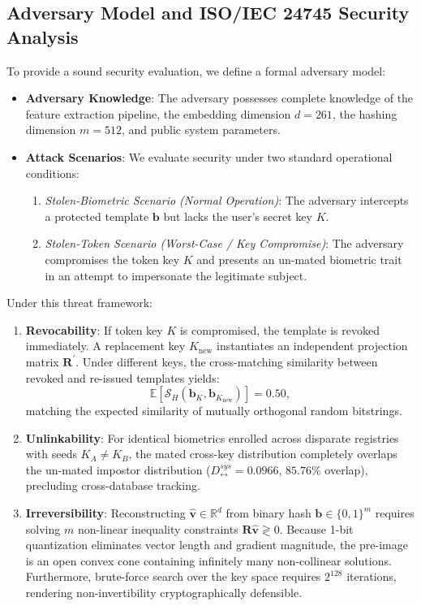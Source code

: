 \documentclass[lettersize,journal]{IEEEtran}
\begin{document}
\subsection{Adversary Model and ISO/IEC 24745 Security Analysis}
To provide a sound security evaluation, we define a formal adversary model:
\begin{itemize}
    \item \textbf{Adversary Knowledge}: The adversary possesses complete knowledge of the feature extraction pipeline, the embedding dimension $d=261$, the hashing dimension $m=512$, and public system parameters.
    \item \textbf{Attack Scenarios}: We evaluate security under two standard operational conditions:
    \begin{enumerate}
        \item \textit{Stolen-Biometric Scenario (Normal Operation)}: The adversary intercepts a protected template $\mathbf{b}$ but lacks the user's secret key $K$.
        \item \textit{Stolen-Token Scenario (Worst-Case / Key Compromise)}: The adversary compromises the token key $K$ and presents an un-mated biometric trait in an attempt to impersonate the legitimate subject.
    \end{enumerate}
\end{itemize}

Under this threat framework:
\begin{enumerate}
    \item \textbf{Revocability}: If token key $K$ is compromised, the template is revoked immediately. A replacement key $K_{\text{new}}$ instantiates an independent projection matrix $\mathbf{R}^{\prime}$. Under different keys, the cross-matching similarity between revoked and re-issued templates yields:
    \begin{equation}
        \mathbb{E}[\mathcal{S}_H(\mathbf{b}_K, \mathbf{b}_{K_{\text{new}}})] = 0.50,
    \end{equation}
    matching the expected similarity of mutually orthogonal random bitstrings.
    \item \textbf{Unlinkability}: For identical biometrics enrolled across disparate registries with seeds $K_A \ne K_B$, the mated cross-key distribution completely overlaps the un-mated impostor distribution ($D_{\leftrightarrow}^{sys} = 0.0966$, $85.76\%$ overlap), precluding cross-database tracking.
    \item \textbf{Irreversibility}: Reconstructing $\hat{\mathbf{v}} \in \mathbb{R}^d$ from binary hash $\mathbf{b} \in \{0, 1\}^m$ requires solving $m$ non-linear inequality constraints $\mathbf{R} \hat{\mathbf{v}} \gtrless 0$. Because 1-bit quantization eliminates vector length and gradient magnitude, the pre-image is an open convex cone containing infinitely many non-collinear solutions. Furthermore, brute-force search over the key space requires $2^{128}$ iterations, rendering non-invertibility cryptographically defensible.
\end{enumerate}
\end{document}

